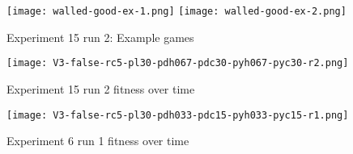 \begin{figure}
  \centering
  \texttt{[image: walled-good-ex-1.png]}   \texttt{[image: walled-good-ex-2.png]}
  \caption{Experiment 15 run 2:  Example games}
  \label{fig:walled-good-game-ex}
\end{figure}

\begin{figure}
   \centering
  \texttt{[image: V3-false-rc5-pl30-pdh067-pdc30-pyh067-pyc30-r2.png]}  
  \caption{Experiment 15 run 2 fitness over time}
  \label{fig:walled-good-1}
\end{figure}


\begin{figure}
   \centering
  \texttt{[image: V3-false-rc5-pl30-pdh033-pdc15-pyh033-pyc15-r1.png]}  
  \caption{Experiment 6 run 1 fitness over time}
  \label{fig:walled-good-2}
\end{figure}


